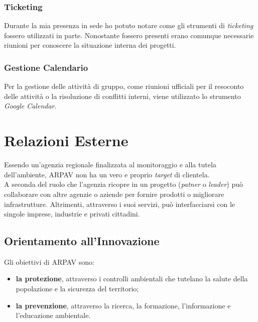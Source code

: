 \subsubsection{Ticketing}

Durante la mia presenza in sede ho potuto notare come gli strumenti di \textit{ticketing} fossero utilizzati in parte. Nonostante fossero presenti erano comunque necessarie riunioni per conoscere la situazione interna dei progetti.
\subsubsection{Gestione Calendario}

Per la gestione delle attività di gruppo, come riunioni ufficiali per il resoconto delle attività o la risoluzione di conflitti interni, viene utilizzato lo strumento \textit{Google Calendar}.




\section{Relazioni Esterne}


Essendo un'agenzia regionale finalizzata al monitoraggio e alla tutela dell'ambiente, ARPAV non ha un vero e proprio \textit{target} di clientela. \\
A seconda del ruolo che l'agenzia ricopre in un progetto (\textit{patner} o \textit{leader}) può collaborare con altre agenzie o aziende per fornire prodotti o migliorare infrastrutture. Altrimenti, attraverso i suoi servizi, può interfacciarsi con le singole imprese, industrie e  privati cittadini. 

\subsection{Orientamento all'Innovazione}
Gli obiettivi di ARPAV sono:
\begin{itemize}
	
\item    \textbf{la protezione}, attraverso i controlli ambientali che tutelano la salute della popolazione e la sicurezza del territorio;
\item \textbf{la prevenzione}, attraverso la ricerca, la formazione, l'informazione e l'educazione ambientale.
\end{itemize} 

